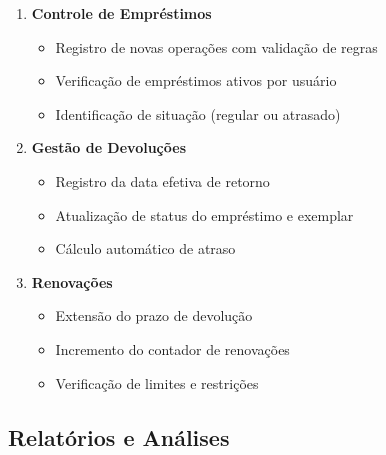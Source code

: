 \documentclass[12pt,a4paper]{article}
\begin{document}
\begin{conceptbox}
\begin{enumerate}[label=\textbf{OC\arabic*.}]
    \item \textbf{Controle de Empréstimos}
    \begin{itemize}
        \item Registro de novas operações com validação de regras
        \item Verificação de empréstimos ativos por usuário
        \item Identificação de situação (regular ou atrasado)
    \end{itemize}

    \item \textbf{Gestão de Devoluções}
    \begin{itemize}
        \item Registro da data efetiva de retorno
        \item Atualização de status do empréstimo e exemplar
        \item Cálculo automático de atraso
    \end{itemize}

    \item \textbf{Renovações}
    \begin{itemize}
        \item Extensão do prazo de devolução
        \item Incremento do contador de renovações
        \item Verificação de limites e restrições
    \end{itemize}
\end{enumerate}
\end{conceptbox}

\subsection{Relatórios e Análises}
\end{document}
